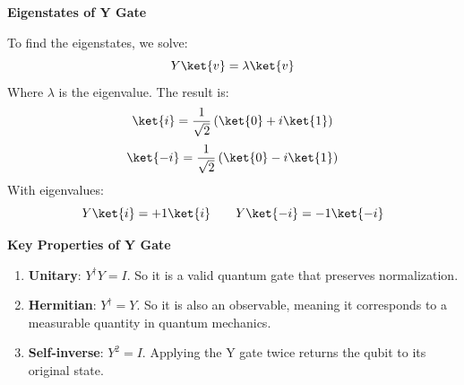 \highspace
\begin{flushleft}
    \textcolor{Green3}{ \textbf{Eigenstates of Y Gate}}
\end{flushleft}
To find the eigenstates, we solve:
\begin{equation*}
    Y\ket{v} = \lambda \ket{v}
\end{equation*}
Where $\lambda$ is the eigenvalue. The result is:
\begin{equation}
    \ket{i} = \dfrac{1}{\sqrt{2}} \left(\ket{0} + i\ket{1}\right)
\end{equation}
\begin{equation}
    \ket{-i} = \dfrac{1}{\sqrt{2}} \left(\ket{0} - i\ket{1}\right)
\end{equation}
With eigenvalues:
\begin{equation}
    Y\ket{i} = +1 \ket{i} \qquad Y\ket{-i} = -1 \ket{-i}
\end{equation}

\highspace
\begin{flushleft}
    \textcolor{Green3}{ \textbf{Key Properties of Y Gate}}
\end{flushleft}
\begin{enumerate}
    \item \textbf{Unitary}: $Y^\dagger Y = I$. So it is a valid quantum gate that preserves normalization.
    \item \textbf{Hermitian}: $Y^\dagger = Y$. So it is also an observable, meaning it corresponds to a measurable quantity in quantum mechanics.
    \item \textbf{Self-inverse}: $Y^2 = I$. Applying the Y gate twice returns the qubit to its original state.
\end{enumerate}
